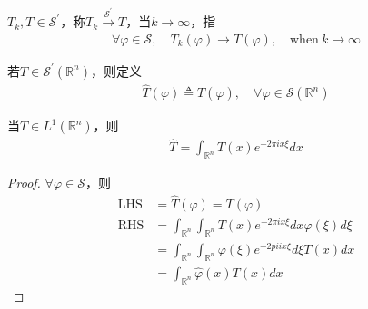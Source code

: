 \begin{proposition}
    $T_k, T\in \mathcal{S}^{\prime}$，称$T_k\overset{\mathcal{S}^{\prime}}{\to} T$，当$k\to\infty$，指
    \begin{align*}
        \forall \varphi\in\mathcal{S},\quad T_k(\varphi) \to T(\varphi),\quad \text{when}\ k\to\infty
    \end{align*}
\end{proposition}

\begin{definition}
    若$T\in\mathcal{S}^{\prime}(\mathbb{R}^n)$，则定义
    \begin{align*}
        \widehat{T}(\varphi) \triangleq T(\widehat{\varphi}),\quad \forall \varphi\in\mathcal{S}(\mathbb{R}^n)
    \end{align*}

    当$T\in L^1(\mathbb{R}^n)$，则
    \begin{align*}
        \hat{T} = \int_{\mathbb{R}^n} T(x) e^{-2\pi i x \xi} dx
    \end{align*}
\end{definition}
\begin{proof}
    $\forall \varphi\in\mathcal{S}$，则
    \begin{align*}
        \operatorname{LHS} &= \widehat{T}(\varphi) = T(\varphi) \\
        \operatorname{RHS} &= \int_{\mathbb{R}^n} \int_{\mathbb{R}^n} T(x) e^{-2\pi i x \xi} dx \varphi(\xi) d\xi \\
        &= \int_{\mathbb{R}^n} \int_{\mathbb{R}^n} \varphi(\xi) e^{-2pi i x \xi} d\xi T(x) dx \\
        &= \int_{\mathbb{R}^n} \widehat{\varphi}(x) T(x) dx
    \end{align*}
\end{proof}

